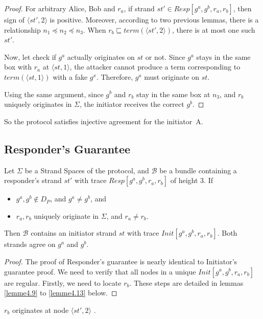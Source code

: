\begin{proof}
For arbitrary Alice, Bob and $r_a$, if strand $st' \in Resp[g^a,g^b,r_a,r_b]$, then sign of $\langle st',2 \rangle$ is positive. Moreover, according to two previous lemmas, there is a relationship $n_1 \preceq n_2 \preceq n_3$. When $r_b \sqsubseteq term(\langle st',2 \rangle )$, there is at most one such $st'$.

Now, let check if $g^a$ actually originates on $st$ or not. Since $g^a$ stays in the same box with $r_a$ at $\langle st,1 \rangle$, the attacker cannot produce a term corresponding to $term(\langle st,1 \rangle )$ with a fake $g^{x}$. Therefore, $g^a$ must originate on $st$. 

Using the same argument, since $g^b$ and $r_b$ stay in the same box at $n_3$, and $r_b$ uniquely originates in $\Sigma$, the initiator receives the correct $g^b$.
\end{proof}

So the protocol satisfies injective agreement for the initiator~A. 


\subsection{Responder's Guarantee }

\begin{Proposition}
Let $\Sigma$ be a Strand Spaces of the protocol, and $\mathcal{B}$ be a bundle containing a responder's strand $st'$ with trace $Resp[g^a,g^b,r_a,r_b]$ of height 3. If
\begin{itemize}
\item $g^a,g^b \not\in D_P$, and $g^a \not= g^b$, and
\item $r_a,r_b$ uniquely originate in $\Sigma$, and $r_a \not= r_b$.
\end{itemize}
Then $\mathcal{B}$ contains an initiator strand $st$ with trace $Init[g^a,g^b,r_a,r_b]$. Both strands agree on $g^a$ and $g^b$.
\end{Proposition}

\begin{proof}
The proof of Responder's guarantee is nearly identical to Initiator's guarantee proof. We need to verify that all nodes in a unique $Init[g^a,g^b,r_a,r_b]$ are regular. Firstly, we need to locate $r_b$. These steps are detailed in lemmas \ref{lemme4.9} to \ref{lemme4.13} below.
\end{proof}

\begin{Lemma}\label{lemme4.9}
$r_b$ originates at node $\langle st',2 \rangle$ .
\end{Lemma} 

